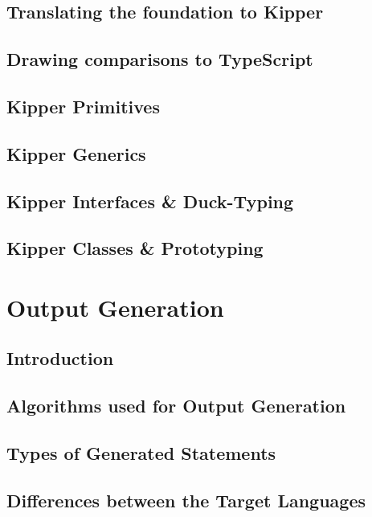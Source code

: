 \subsection{Translating the foundation to Kipper}

\subsection{Drawing comparisons to TypeScript}

\subsection{Kipper Primitives}

\subsection{Kipper Generics}

\subsection{Kipper Interfaces \& Duck-Typing}

\subsection{Kipper Classes \& Prototyping}

\section{Output Generation}

\subsection{Introduction}

\subsection{Algorithms used for Output Generation}

\subsection{Types of Generated Statements}

\subsection{Differences between the Target Languages}

